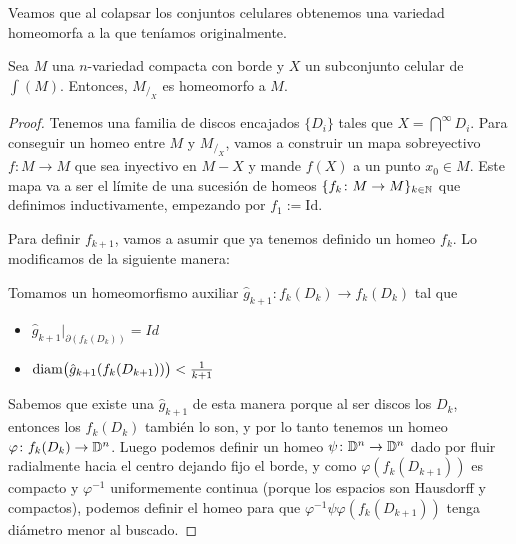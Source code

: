 

Veamos que al colapsar los conjuntos celulares obtenemos una variedad homeomorfa a la que teníamos originalmente.

\begin{lema}\label{colapsar}
    Sea $M$ una $n$-variedad compacta con borde y $X$ un subconjunto celular de $\int(M)$. Entonces, $M_{/_X}$ es homeomorfo a $M$.
\end{lema}
\begin{proof}
    Tenemos una familia de discos encajados $\{D_i\}$ tales que $X=\bigcap\limits^{\infty}D_i$. Para conseguir un homeo entre $M$ y $M_{/_X}$, vamos a construir un mapa sobreyectivo $f:M\to M$ que sea inyectivo en $M-X$ y mande $f(X)$ a un punto $x_0\in M$. Este mapa va a ser el límite de una sucesión de homeos $\{f_k\colon M\to M\}_{k\in\mathbb{N}}$ que definimos inductivamente, empezando por $f_1:= \text{Id}$.

    Para definir $f_{k+1}$, vamos a asumir que ya tenemos definido un homeo $f_k$. Lo modificamos de la siguiente manera:

    Tomamos un homeomorfismo auxiliar $\hat{g}_{k+1}:f_k(D_k)\to f_k(D_k)$ tal que 
    
    \begin{itemize}
        \item $\hat{g}_{k+1}|_{\partial(f_k(D_k))} = Id$
        \item $\text{diam}\big(\hat{g}_{k+1}(f_k(D_{k+1}))\big)<\frac{1}{k+1}$
    \end{itemize}

    Sabemos que existe una $\hat{g}_{k+1}$ de esta manera porque al ser discos los $D_k$, entonces los $f_k(D_k)$ también lo son, y por lo tanto tenemos un homeo $\varphi\colon f_k(D_k)\to \mathbb{D}^n$. Luego podemos definir un homeo $\psi\colon\mathbb{D}^n\to\mathbb{D}^n$ dado por fluir radialmente hacia el centro dejando fijo el borde, y como $\varphi(f_k(D_{k+1}))$ es compacto y $\varphi^{-1}$ uniformemente continua (porque los espacios son Hausdorff y compactos), podemos definir el homeo para que $\varphi^{-1}\psi\varphi(f_k(D_{k+1}))$ tenga diámetro menor al buscado.
    

\end{proof}
